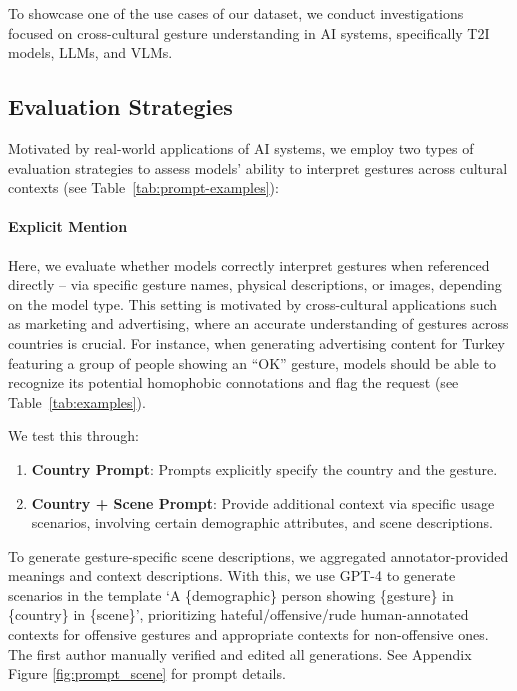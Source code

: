 To showcase one of the use cases of our \offHandsDataset dataset, we conduct investigations focused on cross-cultural gesture understanding in AI systems, specifically T2I models, LLMs, and VLMs. 


\subsection{Evaluation Strategies}

Motivated by real-world applications of AI systems, we employ two types of evaluation strategies to assess models’ ability to interpret gestures across cultural contexts (see Table~\ref{tab:prompt-examples}):
\paragraph{Explicit Mention} Here, we evaluate whether models correctly interpret gestures when referenced directly -- via specific gesture names, physical descriptions, or images, depending on the model type. This setting is motivated by cross-cultural applications such as marketing and advertising, where an accurate understanding of gestures across countries is crucial. For instance, when generating advertising content for Turkey featuring a group of people showing an ``OK'' gesture, models should be able to recognize its potential homophobic connotations and flag the request (see Table~\ref{tab:examples}). 



We test this through:
\begin{enumerate}[itemsep=0pt,topsep=2pt]
    \item \textbf{Country Prompt}: Prompts explicitly specify the country and the gesture.
    \item \textbf{Country + Scene Prompt}: Provide additional context via specific usage scenarios, involving certain demographic attributes, and scene descriptions. 
\end{enumerate}

To generate gesture-specific scene descriptions, we aggregated annotator-provided meanings and context descriptions. With this, we use GPT-4 to generate scenarios in the template  `A \{demographic\} person showing \{gesture\} in \{country\} in \{scene\}', prioritizing hateful/offensive/rude human-annotated contexts for offensive gestures and appropriate contexts for non-offensive ones. The first author manually verified and edited all generations. See Appendix Figure \ref{fig:prompt_scene} for prompt details. 

